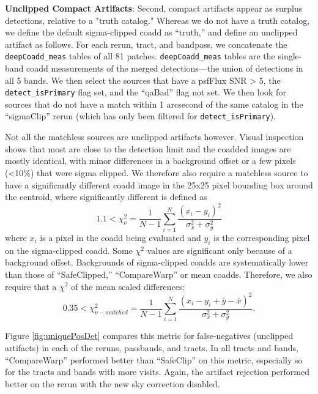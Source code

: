 \documentclass[DM,authoryear,toc]{lsstdoc}
\begin{document}
\textbf{Unclipped Compact Artifacts}: Second, compact artifacts appear as surplus detections, relative to a "truth catalog."
Whereas we do not have a truth catalog, we define the default sigma-clipped coadd as ``truth,'' and define an unclipped artifact as follows.
For each rerun, tract, and bandpass, we concatenate the \texttt{deepCoadd\_meas} tables of all 81 patches.
\texttt{deepCoadd\_meas} tables are the single-band coadd measurements of the merged detections---the union of detections in all 5 bands.
We then select the sources that have a psfFlux SNR > 5, the \texttt{detect\_isPrimary} flag set, and the ``qaBad'' flag not set.
We then look for sources that do not have a match within 1 arcsecond of the same catalog in the ``sigmaClip'' rerun (which has only been filtered for \texttt{detect\_isPrimary}).

Not all the matchless sources are unclipped artifacts however. Visual inspection shows that most are close to the detection limit and the coadded images are mostly identical, with minor differences in a background offset or a few pixels (<10\%)  that were sigma clipped.
We therefore also require a matchless source to have a significantly different coadd image in the 25x25 pixel bounding box around the centroid, where significantly different is defined as
\begin{equation}
1.1 < \chi^2_{\nu} = \frac{1}{N-1}\sum^{N}_{i=1} \frac{{(x_i - y_i)}^2}{\sigma_x^2 + \sigma_y^2}
\end{equation}
where $x_i$ is a pixel in the coadd being evaluated and $y_i$ is the corresponding pixel on the sigma-clipped coadd.
Some $\chi^2$ values are significant only because of a background offset. Backgrounds of sigma-clipped coadds are systematically lower than those of ``SafeClipped,'' ``CompareWarp'' or mean coadds.
Therefore, we also require that a $\chi^2$ of the mean scaled differences:
\begin{equation}
0.35 < \chi^2_{\nu-matched} = \frac{1}{N-1}\sum^{N}_{i=1} \frac{{(x_i - y_i  + \bar{y} - \bar{x})}^2}{\sigma_x^2 + \sigma_y^2}.
\end{equation}

Figure \ref{fig:uniquePosDet} compares this metric for false-negatives (unclipped artifacts) in each of the reruns, passbands, and tracts.
In all tracts and bands, ``CompareWarp'' performed better than ``SafeClip'' on this metric, especially so for the tracts and bands with more visits.
Again, the artifact rejection performed better on the rerun with the new sky correction disabled.
\end{document}
